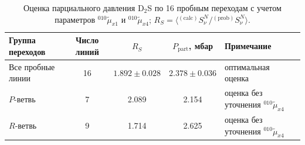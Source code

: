 \begin{table}[htbp]
\centering
\caption{Оценка парциального давления D$_2$S по 16 пробным переходам с учетом параметров ${}^{010}\widetilde{\mu}_{x1}$ и ${}^{010}\widetilde{\mu}_{x4}$; $R_S=\langle{}^{(\textrm{calc})}S^N_\nu/{}^{(\textrm{prob})}S^N_\nu\rangle$.}
\label{tab:d2s_pressure_two_parameters}
\begingroup
\scriptsize
\setlength{\tabcolsep}{3pt}
\renewcommand{\arraystretch}{1.15}
\begin{tabular}{|p{}|c|c|c|p{}|}
\hline
Группа переходов & Число линий & $R_S$ & $P_{\textrm{part}}$, мбар & Примечание \\
\hline
Все пробные линии & 16 & $1.892\pm0.028$ & $2.378\pm0.036$ & оптимальная оценка \\
$P$-ветвь & 7 & 2.089 & 2.154 & оценка без уточнения ${}^{010}\widetilde{\mu}_{x4}$ \\
$R$-ветвь & 9 & 1.714 & 2.625 & оценка без уточнения ${}^{010}\widetilde{\mu}_{x4}$ \\
\hline
\end{tabular}
\endgroup
\end{table}